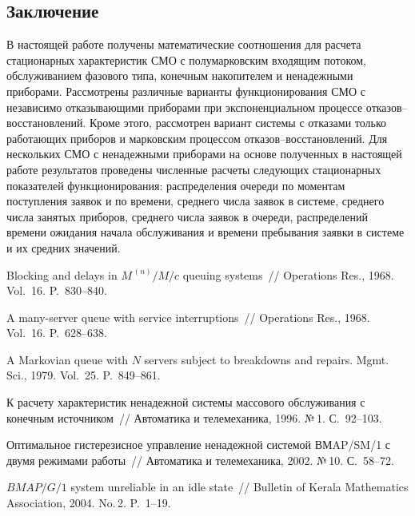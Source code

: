 \begin{multicols}{2}
\section{Заключение}

В настоящей работе получены математические соотношения для расчета
стационарных характеристик СМО с полумарковским входящим потоком,
обслуживанием фазового типа, конечным накопителем и ненадежными приборами.
Рассмотрены различные варианты функционирования СМО с независимо отказывающими приборами
при экспоненциальном процессе отказов--восстановлений.
Кроме этого, рассмотрен вариант системы с отказами только работающих приборов
и марковским процессом отказов--восстановлений.
Для нескольких СМО с ненадежными приборами на основе полученных в настоящей работе результатов
проведены численные расчеты следующих стационарных показателей функционирования:
распределения очереди по моментам поступления заявок и по времени,
среднего числа заявок в системе, среднего числа занятых приборов,
среднего числа заявок в очереди, распределений времени ожидания начала обслуживания
и времени пребывания заявки в системе и их средних значений.

{\small\frenchspacing
{%
\begin{thebibliography}{99}

Blocking and delays in $M^{\,(n)}/M/c$ queuing systems~//
Operations Res., 1968. Vol.~16. P.~830--840.

A many-server queue with service interruptions~//
Operations Res., 1968. Vol.~16. P.~628--638.

A Markovian queue with $N$ servers subject to breakdowns and repairs.
Mgmt. Sci., 1979. Vol.~25. P.~849--861.

К расчету характеристик ненадежной системы массового обслуживания с конечным
источником~// Автоматика и телемеханика, 1996. №\,1. С.~92--103.

Оптимальное гистерезисное управление ненадежной системой
ВМAP/SM/1 с двумя режимами работы~// Автоматика и телемеханика, 2002. №\,10.
С.~58--72.

$BMAP/G/1$ system unreliable in an idle state~//
Bulletin of Kerala Mathematics Association, 2004. No.\,2. P.~1--19.


\end{thebibliography}}}
\end{multicols}
